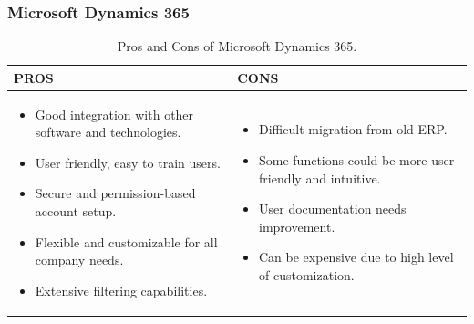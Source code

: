 \subsubsection{Microsoft Dynamics 365}
\begin{table}
    \centering
    \begin{tabular}{|p{}|p{}|}
        \hline
        \textbf{PROS} & \textbf{CONS}                                  \\ \hline
        \begin{itemize}
            \item Good integration with other software and technologies.
            \item User friendly, easy to train users.
            \item Secure and permission-based account setup.
            \item Flexible and customizable for all company needs.
            \item Extensive filtering capabilities.
        \end{itemize}
                      &
        \begin{itemize}
            \item Difficult migration from old ERP.
            \item Some functions could be more user friendly and intuitive.
            \item User documentation needs improvement.
            \item Can be expensive due to high level of customization.
        \end{itemize} \\ \hline
    \end{tabular}
    \caption{Pros and Cons of Microsoft Dynamics 365.}
    \label{tab:microsoft_pros_cons}
\end{table}


